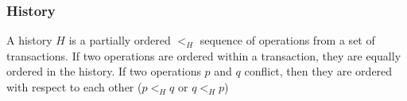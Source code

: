 \subsubsection{History}
A history $H$ is a partially ordered $<_H$ sequence of operations from a set of transactions.
If two operations are ordered within a transaction, they are equally ordered in the history.
If two operations $p$ and $q$ conflict, then they are ordered with respect to each other ($p <_H q$ or $q <_H p$)
